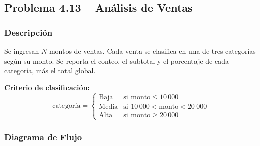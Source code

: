 \documentclass[12pt,a4paper]{article}
\begin{document}
\subsection{Problema 4.13 -- Análisis de Ventas}

\subsubsection{Descripción}

Se ingresan $N$ montos de ventas. Cada venta se clasifica en una de tres categorías según su monto. Se reporta el conteo, el subtotal y el porcentaje de cada categoría, más el total global.

\textbf{Criterio de clasificación:}
\[
  \text{categoría} = \begin{cases}
    \text{Baja}   & \text{si } \text{monto} \leq 10\,000 \\
    \text{Media}  & \text{si } 10\,000 < \text{monto} < 20\,000 \\
    \text{Alta}   & \text{si } \text{monto} \geq 20\,000
  \end{cases}
\]

\subsubsection{Diagrama de Flujo}
\end{document}
